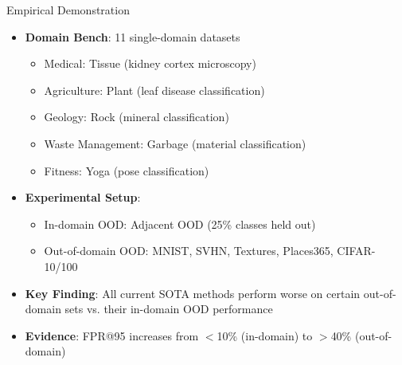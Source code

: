 \documentclass[aspectratio=169]{beamer}
\begin{document}
\begin{frame}{Empirical Demonstration}
\begin{itemize}
    \item \textbf{Domain Bench}: 11 single-domain datasets
    \begin{itemize}
        \item Medical: Tissue (kidney cortex microscopy)
        \item Agriculture: Plant (leaf disease classification)
        \item Geology: Rock (mineral classification)
        \item Waste Management: Garbage (material classification)
        \item Fitness: Yoga (pose classification)
    \end{itemize}
    \item \textbf{Experimental Setup}:
    \begin{itemize}
        \item In-domain OOD: Adjacent OOD (25\% classes held out)
        \item Out-of-domain OOD: MNIST, SVHN, Textures, Places365, CIFAR-10/100
    \end{itemize}
    \item \textbf{Key Finding}: All current SOTA methods perform worse on certain out-of-domain sets vs. their in-domain OOD performance
    \item \textbf{Evidence}: FPR@95 increases from $<$10\% (in-domain) to $>$40\% (out-of-domain)
\end{itemize}
\end{frame}
\end{document}
